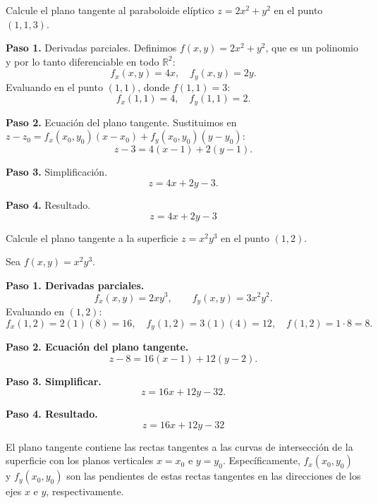 \begin{example}
Calcule el plano tangente al paraboloide elíptico $z = 2x^2 + y^2$ en el punto $(1, 1, 3)$.
\begin{myproof}
\textbf{Paso 1.} Derivadas parciales. Definimos $f(x, y) = 2x^2 + y^2$, que es
un polinomio y por lo tanto diferenciable en todo $\mathbb{R}^2$:
\[
f_x(x, y) = 4x, \quad f_y(x, y) = 2y.
\]
Evaluando en el punto $(1, 1)$, donde $f(1,1)=3$:
\[
f_x(1, 1) = 4, \quad f_y(1, 1) = 2.
\]

\textbf{Paso 2.} Ecuación del plano tangente. Sustituimos en
$z-z_0=f_x(x_0,y_0)(x-x_0)+f_y(x_0,y_0)(y-y_0)$:
\[
z - 3 = 4(x - 1) + 2(y - 1).
\]

\textbf{Paso 3.} Simplificación.
\[
z = 4x + 2y - 3.
\]

\textbf{Paso 4.} Resultado.
\[
\boxed{z = 4x + 2y - 3}
\]
\end{myproof}
\end{example}

\begin{prob}
Calcule el plano tangente a la superficie $z = x^2 y^3$ en el punto $(1, 2)$.
\begin{myproof}
Sea $f(x,y)=x^2y^3$.

\textbf{Paso 1. Derivadas parciales.}
\[
f_x(x,y)=2xy^3,\qquad f_y(x,y)=3x^2y^2.
\]
Evaluando en $(1,2)$:
\[
f_x(1,2)=2(1)(8)=16,\quad f_y(1,2)=3(1)(4)=12,\quad f(1,2)=1\cdot 8=8.
\]

\textbf{Paso 2. Ecuación del plano tangente.}
\[
z-8=16(x-1)+12(y-2).
\]

\textbf{Paso 3. Simplificar.}
\[
z = 16x + 12y - 32.
\]

\textbf{Paso 4. Resultado.}
\[
\boxed{z=16x+12y-32}
\]
\end{myproof}
\end{prob}

\begin{rem}
El plano tangente contiene las rectas tangentes a las curvas de intersección de la superficie con los planos verticales $x = x_0$ e $y = y_0$. Específicamente, $f_x(x_0, y_0)$ y $f_y(x_0, y_0)$ son las pendientes de estas rectas tangentes en las direcciones de los ejes $x$ e $y$, respectivamente.
\end{rem}

